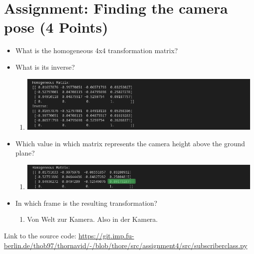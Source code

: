 \section{Assignment: Finding the camera pose (4 Points)}
\begin{itemize}
    \item What is the homogeneous 4x4 transformation matrix?
    \item What is its inverse?
    \begin{enumerate}[]
        \item \includegraphics[width=1\textwidth]{src/u4/task6.png}
    \end{enumerate}
    
    \item Which value in which matrix represents the camera height above the ground plane?
    \begin{enumerate}[]
        \item \includegraphics[width=1\textwidth]{src/u4/task6_2.png}
    \end{enumerate}
    
    \item In which frame is the resulting transformation?
    \begin{enumerate}[]
        \item Von Welt zur Kamera. Also in der Kamera.
    \end{enumerate}
\end{itemize}  

\item Link to the source code: \url{https://git.imp.fu-berlin.de/thob97/thornavid/-/blob/thore/src/assignment4/src/subscriberclass.py}

